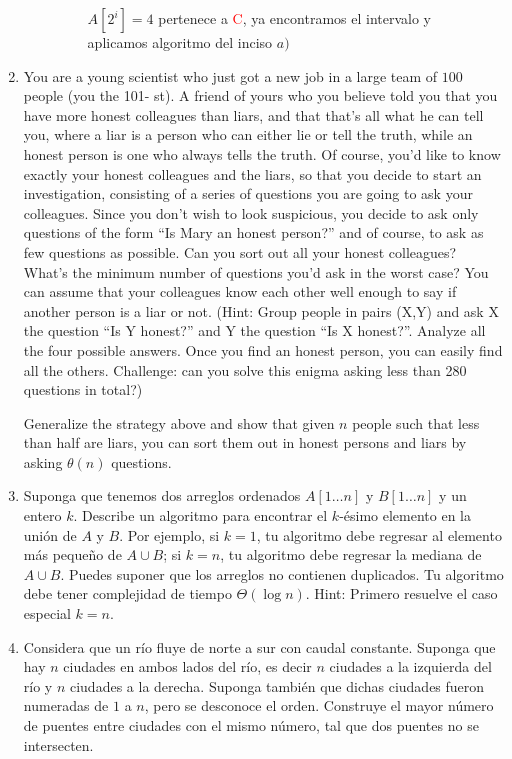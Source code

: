 \documentclass[letterpaper,11pt]{article}
\begin{document}
\begin{enumerate}
\begin{enumerate}
\begin{figure}[h!]
        \caption{$A[2^i] = 4$ pertenece a \textcolor{red}{C}, ya encontramos el 
                 intervalo y aplicamos algoritmo del inciso $a)$}
        \end{figure}
    \end{enumerate}
    
    \item You are a young scientist who just got a new job in a large team of 
    $100$ people (you the 101- st). A friend of yours who you believe told you 
    that you have more honest colleagues than liars, and that that’s all what 
    he can tell you, where a liar is a person who can either lie or tell the 
    truth, while an honest person is one who always tells the truth. Of course, 
    you’d like to know exactly your honest colleagues and the liars, so that 
    you decide to start an investigation, consisting of a series of questions 
    you are going to ask your colleagues. Since you don’t wish to look 
    suspicious, you decide to ask only questions of the form “Is Mary an honest 
    person?” and of course, to ask as few questions as possible. Can you sort 
    out all your honest colleagues? What’s the minimum number of questions you’d 
    ask in the worst case? You can assume that your colleagues know each other 
    well enough to say if another person is a liar or not. (Hint: Group people 
    in pairs (X,Y) and ask X the question “Is Y honest?” and Y the question 
    “Is X honest?”. Analyze all the four possible answers. Once you find an 
    honest person, you can easily find all the others. Challenge: can you solve 
    this enigma asking less than 280 questions in total?)
    
    Generalize the strategy above and show that given $n$ people such that less 
    than half are liars, you can sort them out in honest persons and liars by 
    asking $\theta(n)$ questions.

    \item Suponga que tenemos dos arreglos ordenados $A[1 \dots n]$ y 
    $B[1 \dots n]$ y un entero $k$. Describe un algoritmo para encontrar el 
    $k$-ésimo elemento en la unión de $A$ y $B$. Por ejemplo, si $k = 1$, tu 
    algoritmo debe regresar al elemento más pequeño de $A \cup B$; si $k = n$, tu 
    algoritmo debe regresar la mediana de $A \cup B$. Puedes suponer que los 
    arreglos no contienen duplicados. Tu algoritmo debe tener complejidad de 
    tiempo $\Theta(\log n)$. Hint: Primero resuelve el caso especial $k = n$.

    \item Considera que un río fluye de norte a sur con caudal constante. 
    Suponga que hay $n$ ciudades en ambos lados del río, es decir $n$ ciudades a 
    la izquierda del río y $n$ ciudades a la derecha. Suponga también que dichas 
    ciudades fueron numeradas de $1$ a $n$, pero se desconoce el orden. Construye 
    el mayor número de puentes entre ciudades con el mismo número, tal que dos 
    puentes no se intersecten. 

\end{enumerate}
\end{document}
